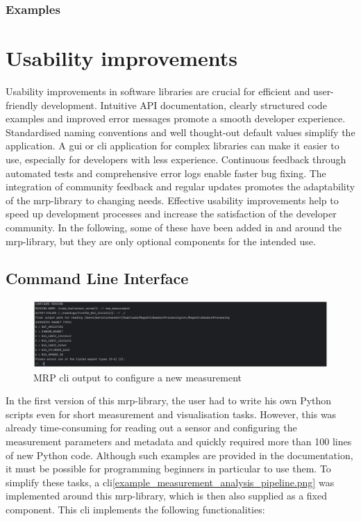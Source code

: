 \hypertarget{examples}{%
\subsection{Examples}\label{examples}}

\hypertarget{usability-improvements}{%
\chapter{Usability improvements}\label{usability-improvements}}

Usability improvements in software libraries are crucial for efficient
and user-friendly development. Intuitive API documentation, clearly
structured code examples and improved error messages promote a smooth
developer experience. Standardised naming conventions and well
thought-out default values simplify the application. A \gls{gui} or
\gls{cli} application for complex libraries can make it easier to use,
especially for developers with less experience. Continuous feedback
through automated tests and comprehensive error logs enable faster bug
fixing. The integration of community feedback and regular updates
promotes the adaptability of the \gls{mrp}-library to changing needs.
Effective usability improvements help to speed up development processes
and increase the satisfaction of the developer community. In the
following, some of these have been added in and around the
\gls{mrp}-library, but they are only optional components for the
intended use.

\hypertarget{command-line-interface}{%
\section{Command Line Interface}\label{command-line-interface}}

\begin{figure}
\centering
\includegraphics{./generated_images/border_MRP_(+cli)_output_to_configure_a_new_measurement.png}
\caption{MRP \gls{cli} output to configure a new measurement
\label{MRP_(+cli)_output_to_configure_a_new_measurement.png}}
\end{figure}

In the first version of this \gls{mrp}-library, the user had to write
his own Python scripts even for short measurement and visualisation
tasks. However, this was already time-consuming for reading out a sensor
and configuring the measurement parameters and metadata and quickly
required more than 100 lines of new Python code. Although such examples
are provided in the documentation, it must be possible for programming
beginners in particular to use them. To simplify these tasks, a
\gls{cli}\ref{example_measurement_analysis_pipeline.png} was implemented
around this \gls{mrp}-library, which is then also supplied as a fixed
component. This \gls{cli} implements the following functionalities:

